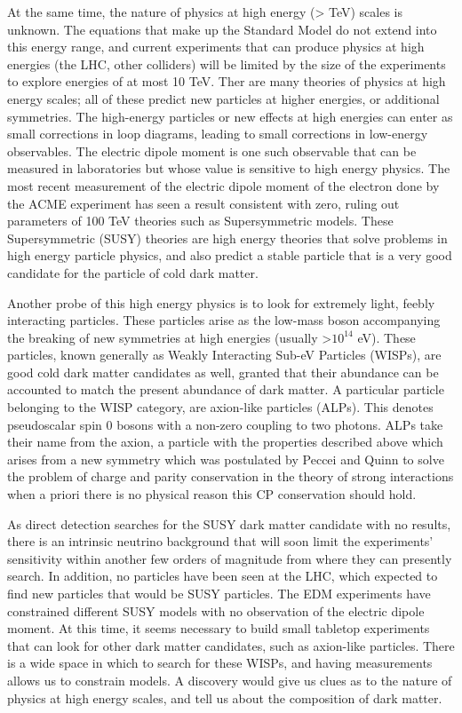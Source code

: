 \documentclass[12pt,twosides]{book}
\begin{document}
At the same time, the nature of physics at high energy (> TeV) scales is unknown. The equations that make up the Standard Model do not extend into this energy range, and current experiments that can produce physics at high energies (the LHC, other colliders) will be limited by the size of the experiments to explore energies of at most 10 TeV. Ther are many theories of physics at high energy scales; all of these predict new particles at higher energies, or additional symmetries. The high-energy particles or new effects at high energies can enter as small corrections in loop diagrams, leading to small corrections in low-energy observables. The electric dipole moment is one such observable that can be measured in laboratories but whose value is sensitive to high energy physics. The most recent measurement of the electric dipole moment of the electron \cite{acme14} done by the ACME experiment has seen a result consistent with zero, ruling out parameters of 100 TeV theories such as Supersymmetric models. These Supersymmetric (SUSY) theories are high energy theories that solve problems in high energy particle physics, and also predict a stable particle that is a very good candidate for the particle of cold dark matter.

Another probe of this high energy physics is to look for extremely light, feebly interacting particles. These particles arise as the low-mass boson accompanying the breaking of new symmetries at high energies (usually >$10^{14}$ eV). These particles, known generally as Weakly Interacting Sub-eV Particles (WISPs), are good cold dark matter candidates as well, granted that their abundance can be accounted to match the present abundance of dark matter. A particular particle belonging to the WISP category, are axion-like particles (ALPs). This denotes pseudoscalar spin 0 bosons with a non-zero coupling to two photons. ALPs take their name from the axion, a particle with the properties described above which arises from a new symmetry which was postulated by Peccei and Quinn \cite{peccei77} to solve the problem of charge and parity conservation in the theory of strong interactions when a priori there is no physical reason this CP conservation should hold.

As direct detection searches for  the SUSY dark matter candidate with no results, there is an intrinsic neutrino background that will soon limit the experiments' sensitivity within another few orders of magnitude from where they can presently search. In addition, no particles have been seen at the LHC, which expected to find new particles that would be SUSY particles. The EDM experiments have constrained different SUSY models with no observation of the electric dipole moment. At this time, it seems necessary to build small tabletop experiments that can look for other dark matter candidates, such as axion-like particles. There is a wide space in which to search for these WISPs, and having measurements allows us to constrain models. A discovery would give us clues as to the nature of physics at high energy scales, and tell us about the composition of dark matter.
\end{document}
